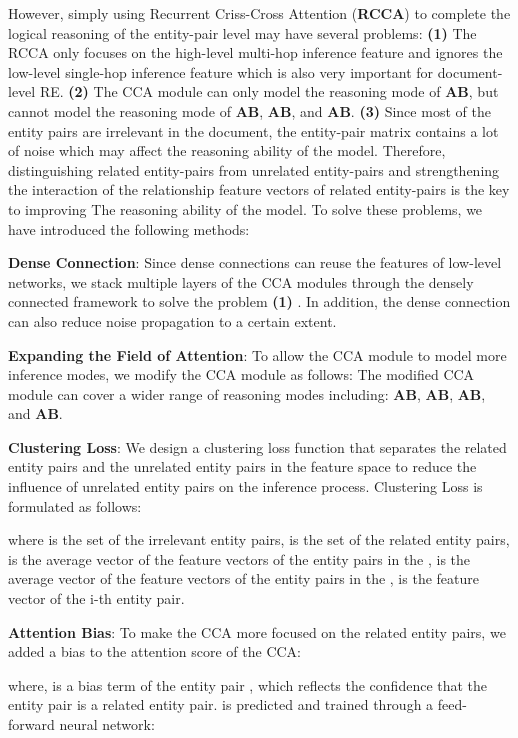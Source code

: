\documentclass[11pt]{article}
\begin{document}
However, simply using Recurrent Criss-Cross Attention (\textbf{RCCA}) \cite{c:116} to complete the logical reasoning of the entity-pair level may have several problems:
\textbf{(1)} The RCCA only focuses on the high-level multi-hop inference feature and ignores the low-level single-hop inference feature which is also very important for document-level RE.
\textbf{(2)} The CCA module can only model the reasoning mode of \textbf{AB}, but cannot model the reasoning mode of \textbf{AB},  \textbf{AB}, and \textbf{AB}.
\textbf{(3)} Since most of the entity pairs are irrelevant in the document, the entity-pair matrix  contains a lot of noise which may affect the reasoning ability of the model.  
Therefore, distinguishing related entity-pairs from unrelated entity-pairs and strengthening the interaction of the relationship feature vectors of related entity-pairs is the key to improving The reasoning ability of the model.
To solve these problems, we have introduced the following methods:

\noindent
\textbf{Dense Connection}: Since dense connections can reuse the features of low-level networks, we stack multiple layers of the CCA modules through the densely connected framework to solve the problem \textbf{(1)} .
In addition, the dense connection can also reduce noise propagation to a certain extent.

\noindent
\textbf{Expanding the Field of Attention}: 
To allow the CCA module to model more inference modes, we modify the CCA module as follows: 
The modified CCA module can cover a wider range of reasoning modes including: \textbf{AB}, \textbf{AB},  \textbf{AB}, and \textbf{AB}.

\noindent
\textbf{Clustering Loss}:
We design a clustering loss function that separates the related entity pairs and the unrelated entity pairs in the feature space to reduce the influence of unrelated entity pairs on the inference process. 
Clustering Loss is formulated as follows:

where  is the set of the irrelevant entity pairs,  is the set of the related entity pairs,  is the average vector of the feature vectors of the entity pairs in the ,  is the average vector of the feature vectors of the entity pairs in the ,  is the feature vector of the i-th entity pair.

\noindent
\textbf{Attention Bias}:
To make the CCA more focused on the related entity pairs, we added a bias to the attention score of the CCA:

where,  is a bias term of the entity pair , which reflects the confidence that the entity pair  is a related entity pair.
 is predicted and trained through a feed-forward neural network:
\end{document}
